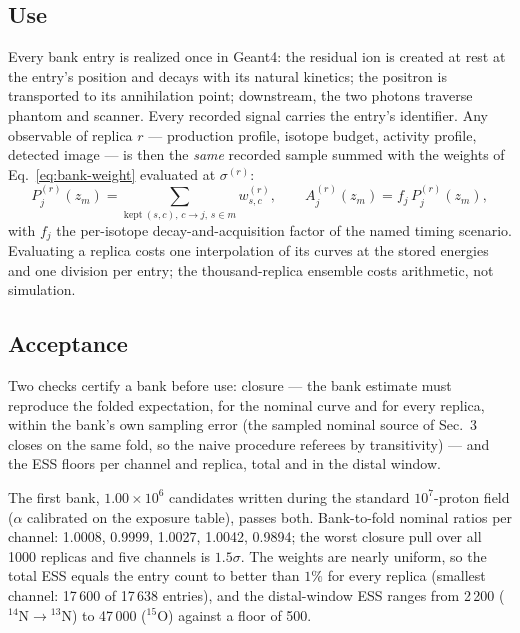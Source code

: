 \documentclass[11pt]{article}
\begin{document}
\subsection{Use}

Every bank entry is realized once in Geant4: the residual ion is created
at rest at the entry's position and decays with its natural kinetics; the
positron is transported to its annihilation point; downstream, the two
photons traverse phantom and scanner.  Every recorded signal carries the
entry's identifier.  Any observable of replica $r$ --- production profile,
isotope budget, activity profile, detected image --- is then the \emph{same}
recorded sample summed with the weights of Eq.~\eqref{eq:bank-weight}
evaluated at $\sigma^{(r)}$:
\begin{equation}
  P^{(r)}_{j}(z_m)=\sum_{\mathrm{kept}\ (s,c),\, c\to j,\, s\in m}
  w^{(r)}_{s,c},
  \qquad
  A^{(r)}_{j}(z_m)=f_j\,P^{(r)}_{j}(z_m),
  \label{eq:bank-observables}
\end{equation}
with $f_j$ the per-isotope decay-and-acquisition factor of the named timing
scenario.  Evaluating a replica costs one interpolation of its curves at
the stored energies and one division per entry; the thousand-replica
ensemble costs arithmetic, not simulation.

\subsection{Acceptance}

Two checks certify a bank before use: closure --- the bank estimate must
reproduce the folded expectation, for the nominal curve and for every
replica, within the bank's own sampling error (the sampled nominal source
of Sec.~3 closes on the same fold, so the naive procedure referees by
transitivity) --- and the ESS floors per channel and replica, total and in
the distal window.

The first bank, $1.00\times10^{6}$ candidates written during the standard
$10^{7}$-proton field ($\alpha$ calibrated on the exposure table), passes
both.  Bank-to-fold nominal ratios per channel: 1.0008, 0.9999, 1.0027,
1.0042, 0.9894; the worst closure pull over all 1000 replicas and five
channels is $1.5\sigma$.  The weights are nearly uniform, so the total ESS
equals the entry count to better than $1\%$ for every replica (smallest
channel: 17\,600 of 17\,638 entries), and the distal-window ESS ranges
from 2\,200 ($^{14}$N$\to$$^{13}$N) to 47\,000 ($^{15}$O) against a floor
of 500.
\end{document}
